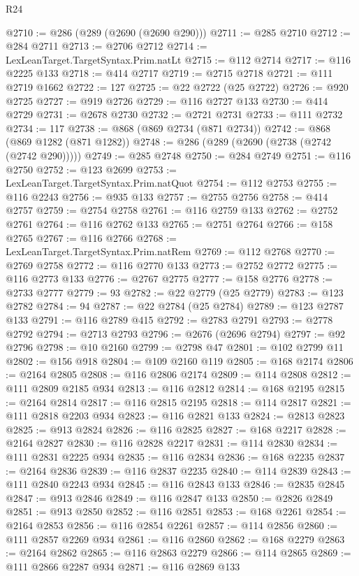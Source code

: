 \begin{lexlean}{R24}
\begin{coremodule}
{{{{{{{{{{{{{{{{{{{{{{{{{{{{{{{{{{{{{{{{{{{{{{{{{{{{{{{{{{{{{{{{{{{{{{{{{{{{{{{{{{{{{{{{{{{{{{{{{{{{{{{{{{{{{{{{{{{{{{{{{{{{{{{{{{{{{{{{{{{{{{{{{{{{{{{{{{{{{{{{{{{{{{{{{{{{{{{{{{{{{{{{{{{{{{{{{{{@2710 := @286 (@289 (@2690 (@2690 @290)))
@2711 := @285 @2710
@2712 := @284 @2711
@2713 := @2706 @2712
@2714 := LexLeanTarget.TargetSyntax.Prim.natLt
@2715 := @112 @2714
@2717 := @116 @2225 @133
@2718 := @414 @2717
@2719 := @2715 @2718
@2721 := @111 @2719 @1662
@2722 := 127
@2725 := @22 @2722 (@25 @2722)
@2726 := @920 @2725
@2727 := @919 @2726
@2729 := @116 @2727 @133
@2730 := @414 @2729
@2731 := @2678 @2730
@2732 := @2721 @2731
@2733 := @111 @2732
@2734 := 117
@2738 := @868 (@869 @2734 (@871 @2734))
@2742 := @868 (@869 @1282 (@871 @1282))
@2748 := @286 (@289 (@2690 (@2738 (@2742 (@2742 @290)))))
@2749 := @285 @2748
@2750 := @284 @2749
@2751 := @116 @2750
@2752 := @123 @2699
@2753 := LexLeanTarget.TargetSyntax.Prim.natQuot
@2754 := @112 @2753
@2755 := @116 @2243
@2756 := @935 @133
@2757 := @2755 @2756
@2758 := @414 @2757
@2759 := @2754 @2758
@2761 := @116 @2759 @133
@2762 := @2752 @2761
@2764 := @116 @2762 @133
@2765 := @2751 @2764
@2766 := @158 @2765
@2767 := @116 @2766
@2768 := LexLeanTarget.TargetSyntax.Prim.natRem
@2769 := @112 @2768
@2770 := @2769 @2758
@2772 := @116 @2770 @133
@2773 := @2752 @2772
@2775 := @116 @2773 @133
@2776 := @2767 @2775
@2777 := @158 @2776
@2778 := @2733 @2777
@2779 := 93
@2782 := @22 @2779 (@25 @2779)
@2783 := @123 @2782
@2784 := 94
@2787 := @22 @2784 (@25 @2784)
@2789 := @123 @2787 @133
@2791 := @116 @2789 @415
@2792 := @2783 @2791
@2793 := @2778 @2792
@2794 := @2713 @2793
@2796 := @2676 (@2696 @2794)
@2797 := @92 @2796
@2798 := @10 @2160
@2799 := @2798 @47
@2801 := @102 @2799 @11
@2802 := @156 @918
@2804 := @109 @2160 @119
@2805 := @168 @2174
@2806 := @2164 @2805
@2808 := @116 @2806 @2174
@2809 := @114 @2808
@2812 := @111 @2809 @2185 @934
@2813 := @116 @2812
@2814 := @168 @2195
@2815 := @2164 @2814
@2817 := @116 @2815 @2195
@2818 := @114 @2817
@2821 := @111 @2818 @2203 @934
@2823 := @116 @2821 @133
@2824 := @2813 @2823
@2825 := @913 @2824
@2826 := @116 @2825
@2827 := @168 @2217
@2828 := @2164 @2827
@2830 := @116 @2828 @2217
@2831 := @114 @2830
@2834 := @111 @2831 @2225 @934
@2835 := @116 @2834
@2836 := @168 @2235
@2837 := @2164 @2836
@2839 := @116 @2837 @2235
@2840 := @114 @2839
@2843 := @111 @2840 @2243 @934
@2845 := @116 @2843 @133
@2846 := @2835 @2845
@2847 := @913 @2846
@2849 := @116 @2847 @133
@2850 := @2826 @2849
@2851 := @913 @2850
@2852 := @116 @2851
@2853 := @168 @2261
@2854 := @2164 @2853
@2856 := @116 @2854 @2261
@2857 := @114 @2856
@2860 := @111 @2857 @2269 @934
@2861 := @116 @2860
@2862 := @168 @2279
@2863 := @2164 @2862
@2865 := @116 @2863 @2279
@2866 := @114 @2865
@2869 := @111 @2866 @2287 @934
@2871 := @116 @2869 @133
}}}}}}}}}}}}}}}}}}}}}}}}}}}}}}}}}}}}}}}}}}}}}}}}}}}}}}}}}}}}}}}}}}}}}}}}}}}}}}}}}}}}}}}}}}}}}}}}}}}}}}}}}}}}}}}}}}}}}}}}}}}}}}}}}}}}}}}}}}}}}}}}}}}}}}}}}}}}}}}}}}}}}}}}}}}}}}}}}}}}}}}}}}}}}}}}}}}
\end{coremodule}
\end{lexlean}

